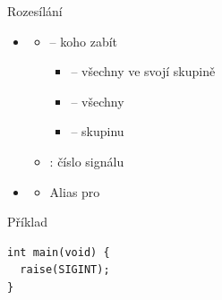 \begin{frame}[fragile]{Rozesílání}

  \begin{itemize}
    \item {}
    \begin{itemize}
      \item {} -- koho zabít
      \ifpcdirlinuxb
      \begin{itemize}
	\item {} -- všechny ve svojí skupině
	\item {} -- všechny
	\item {} -- skupinu 
      \end{itemize}
      \fi

      \pause

      \item {}: číslo signálu
    \end{itemize}

    \pause

    \item {}
    \begin{itemize}
      \item Alias pro 
    \end{itemize}

     \fi

  \end{itemize}


  \begin{block}{Příklad}
  \begin{lstlisting}
int main(void) {
  raise(SIGINT);
}
  \end{lstlisting}
  \end{block}

\end{frame}

\ifpcdirlinuxb

